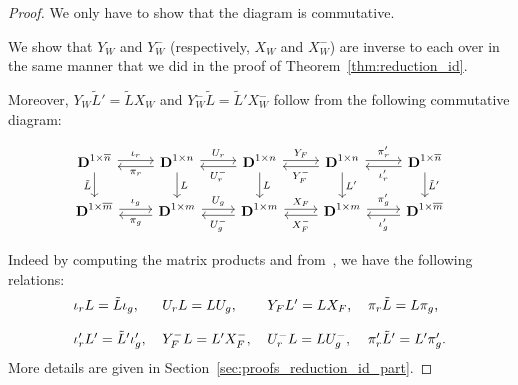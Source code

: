 \documentclass[10pt]{article}
\newcommand\g[1]{\textbf{#1}}
\newcommand\D{\g{D}}
\begin{document}
\begin{proof}
  We only have to show that the diagram is commutative.

  We show that $Y_W$ and $Y_W^-$ (respectively, $X_W$ and $X_W^-$) are
  inverse to each over in the same manner that we did in the proof of
  Theorem~\ref{thm:reduction_id}.

  Moreover, $Y_W\tilde{L}'=\tilde{L}X_W$ and $Y_W^-\tilde{L}=\tilde{L}'
  X_W^-$ follow from the following commutative diagram:
  \begin{center}
    \begin{equation}\label{equ:main_commutative_diagram_zero_part}
      \begin{tikzcd}
        \D^{1\times\overline{n}}\arrow[d, "\tilde{L}"']\arrow[r, "\iota_r", shift right=-0.5ex] &
        \D^{1\times n}\arrow[d, "L"]\arrow[r, "U_r", shift right=-0.5ex]
        \arrow[l, "\pi_r", shift left=0.5ex] &
        \D^{1\times n}\arrow[d, "L"]\arrow[r, "Y_F", shift right=-0.5ex] 
        \arrow[l, "U_r^-", shift right=-0.5ex] &
        \D^{1\times n}\arrow[d, "L'"]\arrow[r, "\pi'_r", shift right=-0.5ex] 
        \arrow[l, "Y_F^-", shift right=-0.5ex] &
        \D^{1\times\overline{n}}\arrow[d, "\tilde{L}'"]
        \arrow[l, "\iota_r'", shift right=-0.5ex] 
        \\
        \D^{1\times\overline{m}}\arrow[r, "\iota_g", shift right=-0.5ex] &
        \D^{1\times m}\arrow[r, "U_g", shift right=-0.5ex]
        \arrow[l, "\pi_g", shift left=0.5ex] &
        \D^{1\times m}\arrow[r, "X_F", shift right=-0.5ex]
        \arrow[l, "U_g^-", shift right=-0.5ex] &
        \D^{1\times m}\arrow[r, "\pi'_g", shift right=-0.5ex]
        \arrow[l, "X_F^-", shift right=-0.5ex] &
        \D^{1\times\overline{m}}
        \arrow[l, "\iota_g'", shift right=-0.5ex] 
      \end{tikzcd}
    \end{equation}
  \end{center}
  Indeed by computing the matrix products and
  from~\cite{cluzeau2011constructive}, we have the following relations:
  \begin{equation}
    \label{eq:formulas_reduction_id_part}
    \begin{tabular}{l l l l}
      $\iota_rL=\tilde{L}\iota_g,$ & $U_rL=LU_g,$ & $Y_FL'=LX_F$, &
      $\pi_r\tilde{L}=L\pi_g$,\\
      & & \\
      $\iota_r'L'=\tilde{L}'\iota'_g,$ & $Y_F^-L=L'X_F^-,$ & $U_r^-L=LU_g^-$,
      & $\pi_r'\tilde{L}'=L'\pi'_g$.
    \end{tabular}
  \end{equation}
  More details are given in Section~\ref{sec:proofs_reduction_id_part}.
\end{proof}
\end{document}

